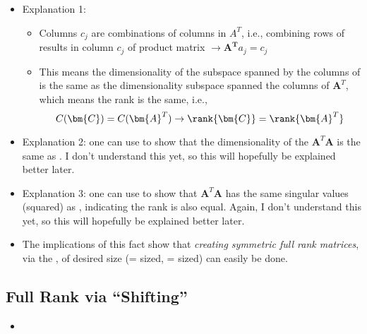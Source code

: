 \begin{itemize}
\begin{itemize}
      \item Explanation 1:
        \begin{itemize}
          \item Columns \(c_j\) are combinations of columns in \(A^T\), i.e., combining rows of  results in column \(c_j\) of product matrix \(\rightarrow \bm{A^T}a_j=c_j \)
          \item This means the dimensionality of the subspace spanned by the columns of  is the same as the dimensionality subspace spanned the columns of \(\bm{A}^T\), which means the rank is the same, i.e.,
          \[%
          C(\bm{C})=C(\bm{A}^T)\rightarrow \rank{\bm{C}} = \rank{\bm{A}^T} 
          \]%
        \end{itemize}
      \item Explanation 2: one can use \hyperref[tbd]{} to show that the dimensionality of the \(\bm{A}^T\bm{A}\) is the same as . I don't understand this yet, so this will hopefully be explained better later.
      \item Explanation 3: one can use \hyperref[tbd]{} to show that \(\bm{A}^T\bm{A}\) has the same singular values (squared) as , indicating the rank is also equal. Again, I don't understand this yet, so this will hopefully be explained better later.
      \item The implications of this fact show that \emph{creating symmetric full rank matrices}, via the \hyperref[Hadamard Multiplication]{}, of desired size (= sized, = sized) can easily be done.
    \end{itemize}
    
    \subsection{Full Rank via ``Shifting''}\label{Full Rank via ``Shifting''}
    \begin{itemize}
      \item 
    \end{itemize}
    
\end{itemize}


